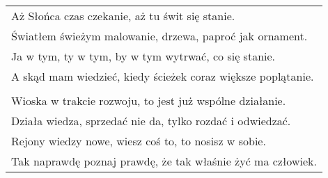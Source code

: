 \documentclass[a5paper]{article}
\begin{document}
\noindent
\begin{tabular}{@{}p{12cm}@{}}
Aż Słońca czas czekanie, aż tu świt się stanie. \\
Światłem świeżym malowanie, drzewa, paproć jak ornament. \\
Ja w tym, ty w tym, by w tym wytrwać, co się stanie. \\
A skąd mam wiedzieć, kiedy ścieżek coraz większe poplątanie. \\ \\

Wioska w trakcie rozwoju, to jest już wspólne działanie. \\
Działa wiedza, sprzedać nie da, tylko rozdać i odwiedzać. \\
Rejony wiedzy nowe, wiesz coś to, to nosisz w sobie. \\
Tak naprawdę poznaj prawdę, że tak właśnie żyć ma człowiek.
\end{tabular}
\end{document}
